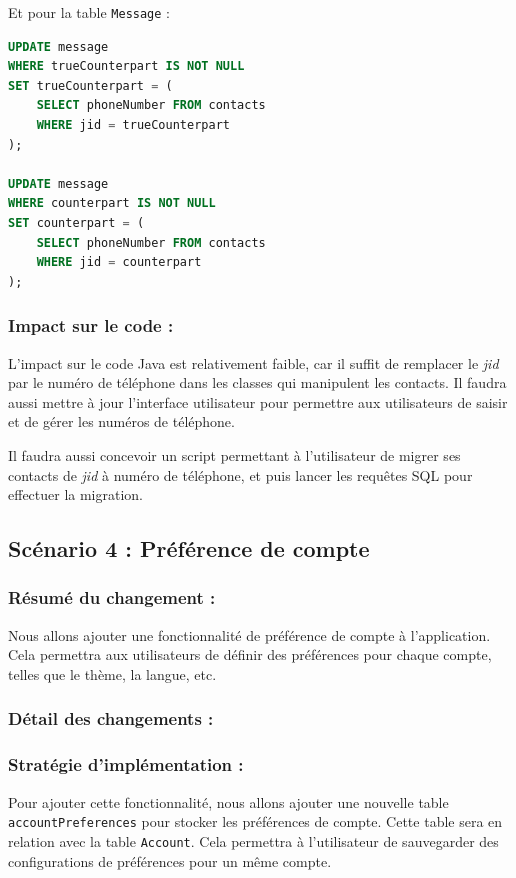 \documentclass[a4paper,11pt]{article}
\begin{document}
Et pour la table \texttt{Message} :

\begin{lstlisting}[language=SQL]
UPDATE message
WHERE trueCounterpart IS NOT NULL
SET trueCounterpart = (
	SELECT phoneNumber FROM contacts 
	WHERE jid = trueCounterpart
);

UPDATE message
WHERE counterpart IS NOT NULL
SET counterpart = (
	SELECT phoneNumber FROM contacts 
	WHERE jid = counterpart
);
\end{lstlisting}

\subsubsection*{Impact sur le code :}

L'impact sur le code Java est relativement faible, car il suffit de remplacer le \textit{jid} par le numéro de téléphone dans les classes qui manipulent les contacts. Il faudra aussi mettre à jour l'interface utilisateur pour permettre aux utilisateurs de saisir et de gérer les numéros de téléphone.

Il faudra aussi concevoir un script permettant à l'utilisateur de migrer ses contacts de \textit{jid} à numéro de téléphone, et puis lancer les requêtes SQL pour effectuer la migration.

\subsection*{Scénario 4 : Préférence de compte}

\subsubsection*{Résumé du changement :}

Nous allons ajouter une fonctionnalité de préférence de compte à l'application. Cela permettra aux utilisateurs de définir des préférences pour chaque compte, telles que le thème, la langue, etc.

\subsubsection*{Détail des changements :}

\subsubsection*{Stratégie d'implémentation :}

Pour ajouter cette fonctionnalité, nous allons ajouter une nouvelle table \texttt{accountPreferences} pour stocker les préférences de compte. Cette table sera en relation avec la table \texttt{Account}. Cela permettra à l'utilisateur de sauvegarder des configurations de préférences pour un même compte.
\end{document}
